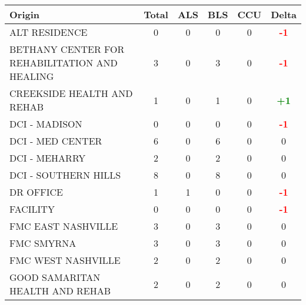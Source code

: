 \documentclass{article}
\begin{document}
\begin{longtable}{l|cccc|c}
\toprule
Origin & Total & ALS & BLS & CCU & Delta \\
\midrule

    
        ALT RESIDENCE & 0 & 0 & 0 & 0 & \textcolor{red}{\textbf{-1}} \\
    

    
        BETHANY CENTER FOR REHABILITATION AND HEALING & 3 & 0 & 3 & 0 & \textcolor{red}{\textbf{-1}} \\
    

    
        CREEKSIDE HEALTH AND REHAB & 1 & 0 & 1 & 0 & \textcolor{green}{\textbf{+1}} \\
    

    
        DCI - MADISON & 0 & 0 & 0 & 0 & \textcolor{red}{\textbf{-1}} \\
    

    
        DCI - MED CENTER & 6 & 0 & 6 & 0 & 0 \\
    

    
        DCI - MEHARRY & 2 & 0 & 2 & 0 & 0 \\
    

    
        DCI - SOUTHERN HILLS & 8 & 0 & 8 & 0 & 0 \\
    

    
        DR OFFICE & 1 & 1 & 0 & 0 & \textcolor{red}{\textbf{-1}} \\
    

    
        FACILITY & 0 & 0 & 0 & 0 & \textcolor{red}{\textbf{-1}} \\
    

    
        FMC EAST NASHVILLE & 3 & 0 & 3 & 0 & 0 \\
    

    
        FMC SMYRNA & 3 & 0 & 3 & 0 & 0 \\
    

    
        FMC WEST NASHVILLE & 2 & 0 & 2 & 0 & 0 \\
    

    
        GOOD SAMARITAN HEALTH AND REHAB & 2 & 0 & 2 & 0 & 0 \\
    


\end{longtable}
\end{document}
